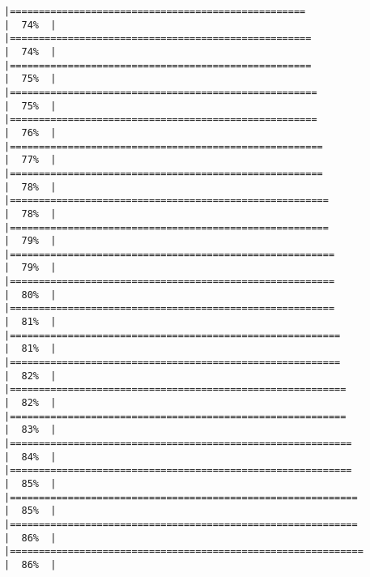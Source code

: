 \documentclass[
]{book}
\begin{document}
\begin{verbatim}
|===================================================                   |  74%  |                                                                              |====================================================                  |  74%  |                                                                              |====================================================                  |  75%  |                                                                              |=====================================================                 |  75%  |                                                                              |=====================================================                 |  76%  |                                                                              |======================================================                |  77%  |                                                                              |======================================================                |  78%  |                                                                              |=======================================================               |  78%  |                                                                              |=======================================================               |  79%  |                                                                              |========================================================              |  79%  |                                                                              |========================================================              |  80%  |                                                                              |========================================================              |  81%  |                                                                              |=========================================================             |  81%  |                                                                              |=========================================================             |  82%  |                                                                              |==========================================================            |  82%  |                                                                              |==========================================================            |  83%  |                                                                              |===========================================================           |  84%  |                                                                              |===========================================================           |  85%  |                                                                              |============================================================          |  85%  |                                                                              |============================================================          |  86%  |                                                                              |=============================================================         |  86%  |                                                                              
\end{verbatim}
\end{document}
